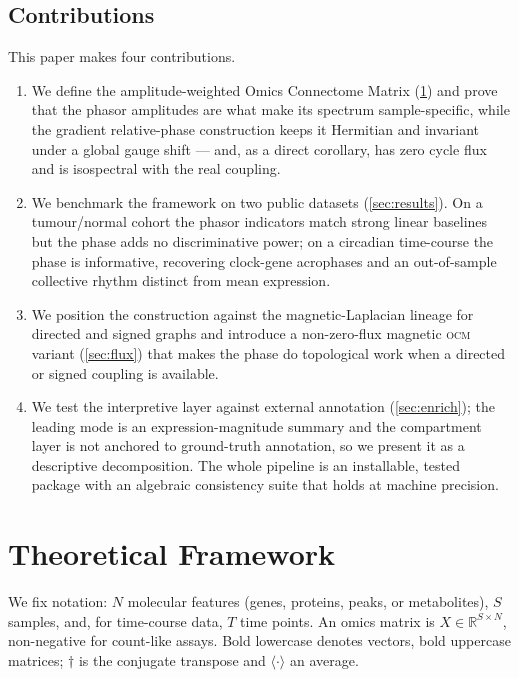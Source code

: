 \documentclass[preprint,12pt,amsmath,amssymb,superscriptaddress,floatfix]{revtex4-2}
\theoremstyle{definition}
\theoremstyle{plain}
\newcommand{\OCM}{\textsc{ocm}}
\begin{document}
\subsection{Contributions}

This paper makes four contributions.
\begin{enumerate}[leftmargin=1.4em]
\item We define the amplitude-weighted Omics Connectome Matrix
(\cref{sec:theory}) and prove that the phasor amplitudes are what make
its spectrum sample-specific, while the gradient relative-phase construction
keeps it Hermitian and invariant under a global gauge shift --- and, as a direct
corollary, has zero cycle flux and is isospectral with the real coupling.
\item We benchmark the framework on two public datasets (\cref{sec:results}). On a
tumour/normal cohort the phasor indicators match strong linear baselines but the
phase adds no discriminative power; on a circadian
time-course the phase is informative, recovering clock-gene acrophases and
an out-of-sample collective rhythm distinct from mean expression.
\item We position the construction against the magnetic-Laplacian lineage for
directed and signed graphs \citep{guo2017hermitian, zhang2021magnet, he2022msgnn,
furutani2019graph, fanuel2018magnetic, bottcher2024complex} and introduce a
non-zero-flux magnetic \OCM{} variant (\cref{sec:flux}) that makes the phase do
topological work when a directed or signed coupling is available.
\item We test the interpretive layer against external annotation
(\cref{sec:enrich}); the leading mode is an expression-magnitude
summary and the compartment layer is not anchored to ground-truth annotation, so
we present it as a descriptive decomposition. The
whole pipeline is an installable, tested package with an algebraic consistency
suite that holds at machine precision.
\end{enumerate}

\section{Theoretical Framework}
\label{sec:theory}

We fix notation: $N$ molecular features (genes, proteins, peaks, or metabolites),
$S$ samples, and, for time-course data, $T$ time points. An omics matrix is
$X\in\mathbb{R}^{S\times N}$, non-negative for count-like assays. Bold lowercase
denotes vectors, bold uppercase matrices; $\dagger$ is the conjugate transpose
and $\langle\cdot\rangle$ an average.
\end{document}
